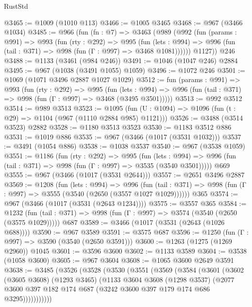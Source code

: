 \begin{lexlean}{RustStd}
\begin{coremodule}
@3465 := @1009 (@1010 @113)
@3466 := @1005 @3465
@3468 := @967 (@3466 @1034)
@3485 := @966
    (fun (fn : @7) =>
    @3463
      (@989
        (@992
          (fun (params : @991) =>
          @993
            (fun (rty : @292) =>
            @995
              (fun (lets : @994) =>
              @996 (fun (tail : @371) => @998 (fun (Γ : @997) => @3468 @1081))))))
        @1127))
    @246
@3488 := @1133 (@3461 (@984 @246))
@3491 := @1046 (@1047 @246) @2884
@3495 := @967 (@1038 (@3491 @1055) @1059)
@3496 := @1072 @246
@3501 := @1069 (@1071 @3496 @2887 @1027 @1029)
@3512 := fun (params : @991) =>
  @993
    (fun (rty : @292) =>
    @995
      (fun (lets : @994) =>
      @996 (fun (tail : @371) => @998 (fun (Γ : @997) => @3468 (@3495 @3501)))))
@3513 := @992 @3512
@3514 := @989 @3513
@3523 := @1095 (fun (U : @1094) => @1096 (fun (t : @29) => @1104 (@967 (@1110 @2884 @985) @1121)))
@3526 := @3488 (@3514 @3523) @2882
@3528 := @1180 @3513 @3523
@3530 := @1183 @3512 @886
@3531 := @1019 @886
@3535 := @967 (@3466 (@1017 (@3531 @1032)))
@3537 := @3491 (@1054 @886)
@3538 := @1038 @3537
@3540 := @967 (@3538 @1059)
@3551 := @1186
    (fun (rty : @292) =>
    @995
      (fun (lets : @994) =>
      @996 (fun (tail : @371) => @998 (fun (Γ : @997) => @3535 (@3540 @3501)))))
    @669
@3555 := @967 (@3466 (@1017 (@3531 @2644)))
@3557 := @2651 @3496 @2887
@3569 := @1208
    (fun (lets : @994) =>
    @996 (fun (tail : @371) => @998 (fun (Γ : @997) => @3555 (@3540 (@2650 (@3557 @1027 @1029))))))
    @365
@3574 := @967 (@3466 (@1017 (@3531 (@2643 @1234))))
@3575 := @3557 @365
@3584 := @1232
    (fun (tail : @371) => @998 (fun (Γ : @997) => @3574 (@3540 (@2650 (@3575 @1029)))))
    @687
@3589 := @3466 (@1017 (@3531 (@2643 (@1026 @688))))
@3590 := @967 @3589
@3591 := @3575 @687
@3596 := @1250 (fun (Γ : @997) => @3590 (@3540 (@2650 @3591)))
@3600 := @1263 (@1275 (@1269 @2960)) @1045
@3601 := @3596 @3600
@3602 := @1133 @3589
@3604 := @3538 (@1058 @3600)
@3605 := @967 @3604
@3608 := @1065 @3600 @2649 @3591
@3638 := @3485
    (@3526
      (@3528
        (@3530
          (@3551
            (@3569
              (@3584
                (@3601
                  (@3602
                    (@3605 @3608)
                    (@1293 @3465)
                    (@1133
                      @3604
                      @3608
                      (@1298 @3537)
                      (@2077
                        @3600
                        @397
                        @182
                        @174
                        @687
                        (@3242 @3600 @397 @179 @174 @686 @3295)))))))))))

\end{coremodule}
\end{lexlean}
